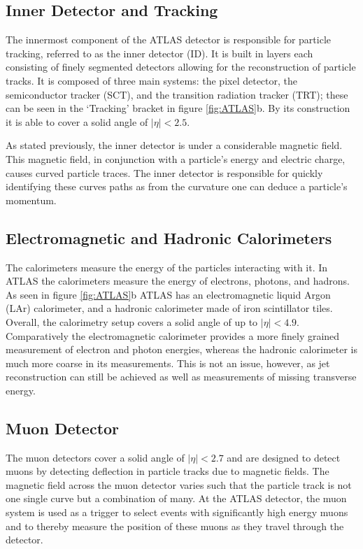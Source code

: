 \subsection{Inner Detector and Tracking}
The innermost component of the ATLAS detector is responsible for particle tracking, referred to as the inner detector (ID).
It is built in layers each consisting of finely segmented detectors allowing for the reconstruction of particle tracks.
It is composed of three main systems: the pixel detector, the semiconductor tracker (SCT), and the transition radiation tracker (TRT); these can be seen in the `Tracking' bracket in figure \ref{fig:ATLAS}b.
By its construction it is able to cover a solid angle of $\left | \eta \right | < 2.5$.

As stated previously, the inner detector is under a considerable magnetic field. 
This magnetic field, in conjunction with a particle's energy and electric charge, causes curved particle traces.
The inner detector is responsible for quickly identifying these curves paths as from the curvature one can deduce a particle's momentum.

\subsection{Electromagnetic and Hadronic Calorimeters}
The calorimeters measure the energy of the particles interacting with it.
In ATLAS the calorimeters measure the energy of electrons, photons, and hadrons.
As seen in figure \ref{fig:ATLAS}b ATLAS has an electromagnetic liquid Argon (LAr) calorimeter, and a hadronic calorimeter made of iron scintillator tiles.
Overall, the calorimetry setup covers a solid angle of up to $\left | \eta \right | < 4.9$.
Comparatively the electromagnetic calorimeter provides a more finely grained measurement of electron and photon energies, whereas the hadronic calorimeter is much more coarse in its measurements.
This is not an issue, however, as jet reconstruction can still be achieved as well as measurements of missing transverse energy.

\subsection{Muon Detector}
The muon detectors cover a solid angle of $\left | \eta \right | < 2.7$ and are designed to detect muons by detecting deflection in particle tracks due to magnetic fields.
The magnetic field across the muon detector varies such that the particle track is not one single curve but a combination of many.
At the ATLAS detector, the muon system is used as a trigger to select events with significantly high energy muons and to thereby measure the position of these muons as they travel through the detector.


